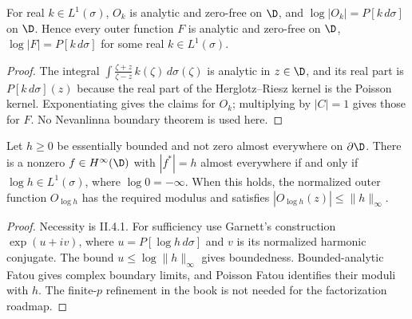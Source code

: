 \begin{theorem}
  \label{thm:outer_function_properties}
  \leanok
  For real $k\in L^1(\sigma)$, $O_k$ is analytic and zero-free on $\D$, and
  $\log|O_k|=P[k\,d\sigma]$ on $\D$. Hence every outer function $F$ is
  analytic and zero-free on $\D$, $\log|F|=P[k\,d\sigma]$ for some real
  $k\in L^1(\sigma)$.
  \begin{proof}
    \notready
    The integral $\int\frac{\zeta+z}{\zeta-z}\,k(\zeta)\,d\sigma(\zeta)$ is
    analytic in $z\in\D$, and its real part is $P[k\,d\sigma](z)$ because the
    real part of the Herglotz--Riesz kernel is the Poisson kernel.
    Exponentiating gives the claims for $O_k$; multiplying by $|C|=1$ gives
    those for $F$. No Nevanlinna boundary theorem is used here.
  \end{proof}
\end{theorem}

\begin{theorem}
  \label{thm:II_4_4}
  \notready
  \mainline
  Let $h\ge0$ be essentially bounded and not zero almost everywhere on
  $\partial\D$. There is a nonzero $f\in H^\infty(\D)$ with $|f^*|=h$
  almost everywhere if and only if $\log h\in L^1(\sigma)$, where
  $\log0=-\infty$. When this holds, the normalized outer function
  $O_{\log h}$ has the required modulus and satisfies
  $|O_{\log h}(z)|\le\|h\|_\infty$.
  \begin{proof}
    \notready
    Necessity is II.4.1. For sufficiency use Garnett's construction
    $\exp(u+iv)$, where $u=P[\log h\,d\sigma]$ and $v$ is its normalized
    harmonic conjugate. The bound $u\le\log\|h\|_\infty$ gives boundedness.
    Bounded-analytic Fatou gives complex boundary limits, and Poisson Fatou
    identifies their moduli with $h$. The finite-$p$ refinement in the book
    is not needed for the factorization roadmap.
  \end{proof}
\end{theorem}

